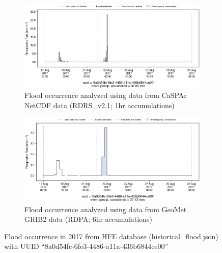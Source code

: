 \documentclass[10pt,a4paper,titlepage,parskip]{scrartcl}
\begin{document}
\begin{figure}[h]
	\begin{subfigure}[a]{1.0\textwidth}
		\centering
		\includegraphics[width=\linewidth]{figures/compare_Geomet_CaSPAr/interpolated_at_stations_occurrence_1464_identified-timesteps_RDRS_v2.1.png}
		\caption{Flood occurrence analyzed using data from CaSPAr NetCDF data (RDRS\_v2.1; 1hr accumulations)}
	\end{subfigure}
	\par\bigskip\bigskip
	\begin{subfigure}[b]{1.0\textwidth}
		\centering
		\includegraphics[width=\linewidth]{figures/compare_Geomet_CaSPAr/interpolated_at_stations_occurrence_1464_identified-timesteps_rdpa:10km:6f.png}
		\caption{Flood occurrence analyzed using data from GeoMet GRIB2 data (RDPA; 6hr accumulations)}
	\end{subfigure}
	\par\bigskip\bigskip
	\caption{Flood occurrence in 2017 from HFE database (historical\_flood.json) with UUID ``8a0d54fc-6fe3-4486-a11a-436b6844ce00''}
\end{figure}
\pagebreak
\end{document}
